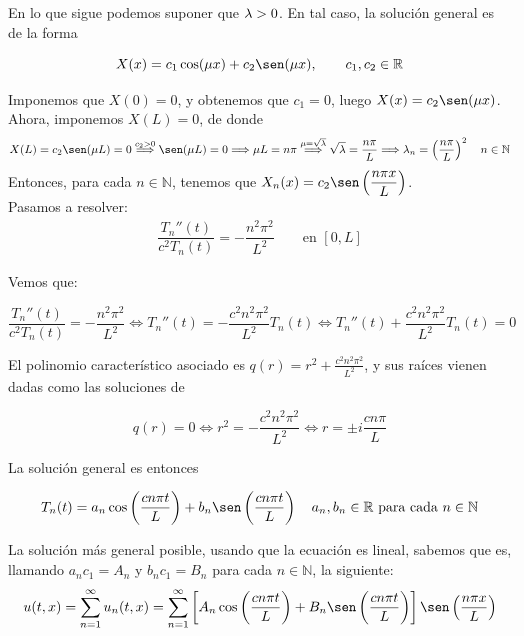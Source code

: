 \documentclass[12pt]{book}
\begin{document}
    En lo que sigue podemos suponer que $\lambda > 0$. En tal caso, la solución general es de la forma 

    \begin{equation*}
        X(x) = c_1\cos(\mu x) + c_2\sen(\mu x), \qquad c_1,c_2\in \mathbb{R}
    \end{equation*}

    Imponemos que $X(0) = 0$, y obtenemos que $c_1 = 0$, luego $X(x) = c_2 \sen (\mu x)$. Ahora, imponemos $X(L) = 0$, de donde
    $$X(L) = c_2 \sen(\mu L) = 0 \stackrel{c_2 > 0}{\Longrightarrow} \sen (\mu L) = 0 \Longrightarrow \mu L = n \pi \stackrel{\mu = \sqrt{\lm}}{\Longrightarrow} \sqrt{\lm} = \dfrac{n \pi}{L} \Longrightarrow \lm_n = \left( \dfrac{n \pi}{L} \right)^2 \quad n \in \mathbb{N}$$
    Entonces, para cada $n \in \mathbb{N}$, tenemos que $X_n(x) = c_2 \sen \left( \dfrac{n \pi x}{L} \right)$. \\

    Pasamos a resolver:
    \begin{equation*}
        \begin{array}{l}
            \dfrac{T_n''(t)}{c^2 T_n(t)} = - \dfrac{n^2 \pi^2}{L^2} \qquad \text{en\ } [0,L]
        \end{array}
    \end{equation*}

    Vemos que:

    $$\dfrac{T_n''(t)}{c^2 T_n(t)} = - \dfrac{n^2 \pi^2}{L^2} \iff T_n''(t) = -  \dfrac{c^2 n^2 \pi^2}{L^2} T_n(t) \iff T_n''(t) + \dfrac{c^2 n^2 \pi^2}{L^2} T_n(t) = 0$$

    El polinomio característico asociado es $q(r) = r^2 + \frac{c^2 n^2 \pi^2}{L^2}$, y sus raíces vienen dadas como las soluciones de

    $$q(r) = 0 \iff r^2 = - \dfrac{c^2 n^2 \pi^2}{L^2} \iff r = \pm i \dfrac{c n \pi}{L}$$

    La solución general es entonces 

    $$T_n(t) = a_n \cos \left( \dfrac{c n \pi t}{L} \right) + b_n \sen \left( \dfrac{c n \pi t}{L} \right) \quad a_n, b_n \in \mathbb{R} \text{ para cada } n \in \mathbb{N}$$

    La solución más general posible, usando que la ecuación es lineal, sabemos que es, llamando $a_n c_1 = A_n$ y $b_n c_1 = B_n$ para cada $n \in \mathbb{N}$, la siguiente:
    $$u(t,x) = \sum_{n=1}^{\infty} u_n(t,x) = \sum_{n=1}^{\infty} \left[A_n \cos \left( \dfrac{c n \pi t}{L} \right) + B_n \sen \left( \dfrac{c n \pi t}{L} \right) \right] \sen \left( \dfrac{n \pi x}{L} \right)$$
\end{document}
